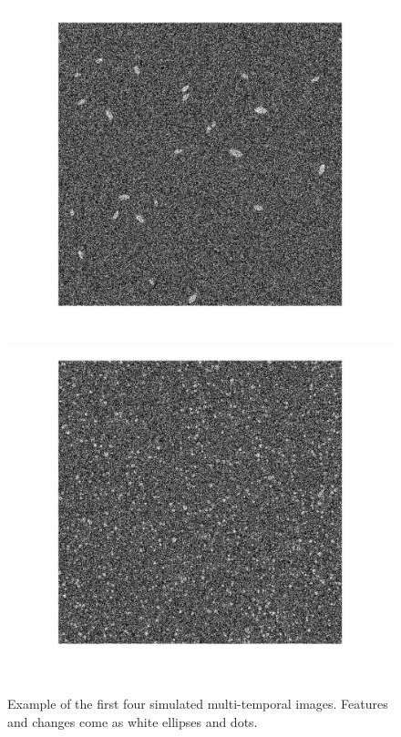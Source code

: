 \documentclass[journal]{IEEEtran}
\begin{document}
\begin{figure}[htb!]
\includegraphics[scale=.11]{../../figs/ellipses_t3}
\includegraphics[scale=.11]{../../figs/ellipses_t4}
\caption{Example of the first four simulated multi-temporal images. Features and changes come as white ellipses and dots.}
\label{F:EllipsoidChanges}
\end{figure}
\end{document}
